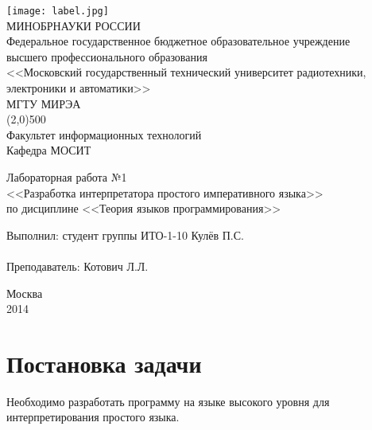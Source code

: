 \documentclass[a4paper,12pt]{article}
\begin{document}
\begin{titlepage}
\begin{center}
  \texttt{[image: label.jpg]}\\
  \vspace{20pt}
  МИНОБРНАУКИ РОССИИ\\
      Федеральное государственное бюджетное образовательное учреждение\\
      высшего профессионального образования\\
    <<Московский государственный технический университет радиотехники,\\
    электроники и автоматики>>\\ 
    {\large МГТУ МИРЭА}\\
    \line(2,0){500}\\
    \vspace{10pt}
    {\large Факультет информационных технологий\\}
    \vspace{10pt}
    {\large Кафедра МОСИТ}
\end{center}

\vspace{60pt}
\begin{center}
  Лабораторная работа №1\\
  \vspace{10pt}
  <<Разработка интерпретатора простого императивного языка>>\\
  \vspace{10pt}
  по дисциплине <<Теория языков программирования>>
\end{center}
\vspace{\fill}
Выполнил: \hfill студент группы ИТО-1-10 Кулёв П.С.\\
\\
Преподаватель: \hfill Котович Л.Л.
\begin{center}
\vspace{\fill}
Москва\\2014
\end{center}
\end{titlepage}

\newpage

\section{Постановка задачи}
\par Необходимо разработать программу на языке высокого уровня для интерпретирования простого языка.
\end{document}
